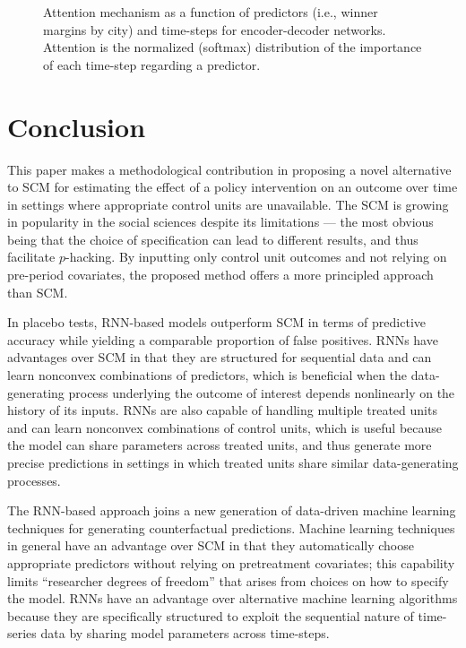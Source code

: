\documentclass[hidelinks,12pt]{article}
\begin{document}
\begin{figure}[htbp]
	\centering
	\caption{Attention mechanism as a function of predictors (i.e., winner margins by city) and time-steps for encoder-decoder
		networks. Attention is the normalized (softmax) distribution of the importance of each time-step regarding a predictor.\label{attn-plot}} 
\end{figure}

\section{Conclusion} \label{conclusion}


This paper makes a methodological contribution in proposing a novel alternative to SCM for estimating the effect of a policy intervention on an outcome over time in settings where appropriate control units are unavailable. The SCM is growing in popularity in the social sciences despite its limitations --- the most obvious being that the choice of specification can lead to different results, and thus facilitate $p$-hacking. By inputting only control unit outcomes and not relying on pre-period covariates, the proposed method offers a more principled approach than SCM. 

In placebo tests, RNN-based models outperform SCM in terms of predictive accuracy while yielding a comparable proportion of false positives. RNNs have advantages over SCM in that they are structured for sequential data and can learn nonconvex combinations of predictors, which is beneficial when the data-generating process underlying the outcome of interest depends nonlinearly on the history of its inputs. RNNs are also capable of handling multiple treated units and can learn nonconvex combinations of control units, which is useful because the model can share parameters across treated units, and thus generate more precise predictions in settings in which treated units share similar data-generating processes.

The RNN-based approach joins a new generation of data-driven machine learning techniques for generating counterfactual predictions. Machine learning techniques in general have an advantage over SCM in that they automatically choose appropriate predictors without relying on pretreatment covariates; this capability limits ``researcher degrees of freedom'' that arises from choices on how to specify the model. RNNs have an advantage over alternative machine learning algorithms because they are specifically structured to exploit the sequential nature of time-series data by sharing model parameters across time-steps.
\end{document}

